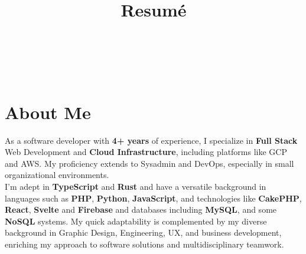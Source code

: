 \documentclass[11pt,a4paper,sans]{moderncv}
\title{Resumé}
\begin{document}
\setsansfont[
	BoldFont={HelveticaNeueLTCom-BdCn}
]{HelveticaNeueLTCom-LtCn}
\setmonofont{Fira Code}



\hfill \\[-2em]
\makecvtitle %
\hfill \\[-6em]


\section{About Me}

 { \flushleft As a software developer with \textbf{4+ years} of experience, I specialize in \textbf{Full Stack} Web Development and \textbf{Cloud Infrastructure}, including platforms like GCP and AWS. My proficiency extends to Sysadmin and DevOps, especially in small organizational environments. \\ I'm adept in \textbf{TypeScript} and \textbf{Rust} and have a versatile background in languages such as \textbf{PHP}, \textbf{Python}, \textbf{JavaScript}, and technologies like \textbf{CakePHP}, \textbf{React}, \textbf{Svelte} and \textbf{Firebase} and databases including \textbf{MySQL}, and some \textbf{NoSQL} systems. My quick adaptability is complemented by my diverse background in Graphic Design, Engineering, UX, and business development, enriching my approach to software solutions and multidisciplinary teamwork. 

 }

\end{document}
